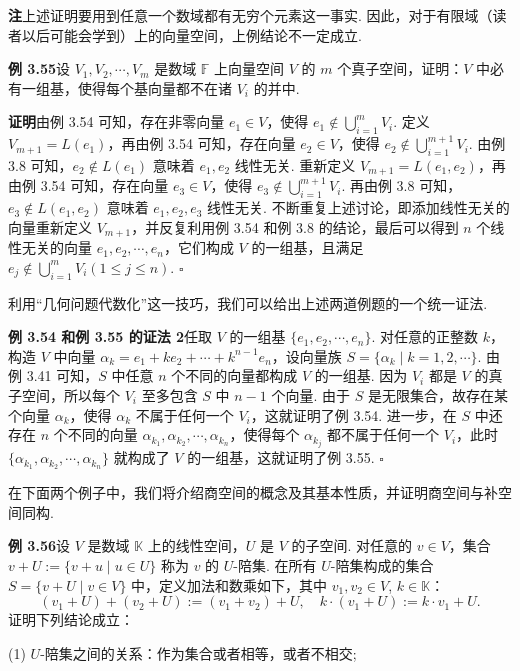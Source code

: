\documentclass[UTF8, 12pt, fontset=fandol, oneside]{ctexart}
\begin{document}
\noindent\textbf{注}\quad 上述证明要用到任意一个数域都有无穷个元素这一事实. 因此，对于有限域（读者以后可能会学到）上的向量空间，上例结论不一定成立.

\noindent\textbf{例 3.55}\quad 设 $V_1,V_2,\cdots,V_m$ 是数域 $\mathbb{F}$ 上向量空间 $V$ 的 $m$ 个真子空间，证明：$V$ 中必有一组基，使得每个基向量都不在诸 $V_i$ 的并中.

\noindent\textbf{证明}\quad 由例 3.54 可知，存在非零向量 $e_1\in V$，使得 $e_1\notin\bigcup_{i=1}^m V_i$. 定义 $V_{m+1}=L(e_1)$，再由例 3.54 可知，存在向量 $e_2\in V$，使得 $e_2\notin\bigcup_{i=1}^{m+1}V_i$. 由例 3.8 可知，$e_2\notin L(e_1)$ 意味着 $e_1,e_2$ 线性无关. 重新定义 $V_{m+1}=L(e_1,e_2)$，再由例 3.54 可知，存在向量 $e_3\in V$，使得 $e_3\notin\bigcup_{i=1}^{m+1}V_i$. 再由例 3.8 可知，$e_3\notin L(e_1,e_2)$ 意味着 $e_1,e_2,e_3$ 线性无关. 不断重复上述讨论，即添加线性无关的向量重新定义 $V_{m+1}$，并反复利用例 3.54 和例 3.8 的结论，最后可以得到 $n$ 个线性无关的向量 $e_1,e_2,\cdots,e_n$，它们构成 $V$ 的一组基，且满足 $e_j\notin\bigcup_{i=1}^m V_i(1\le j\le n)$. $\square$

利用“几何问题代数化”这一技巧，我们可以给出上述两道例题的一个统一证法.

\noindent\textbf{例 3.54 和例 3.55 的证法 2}\quad 任取 $V$ 的一组基 $\{e_1,e_2,\cdots,e_n\}$. 对任意的正整数 $k$，构造 $V$ 中向量 $\alpha_k=e_1+ke_2+\cdots+k^{n-1}e_n$，设向量族 $S=\{\alpha_k\mid k=1,2,\cdots\}$. 由例 3.41 可知，$S$ 中任意 $n$ 个不同的向量都构成 $V$ 的一组基. 因为 $V_i$ 都是 $V$ 的真子空间，所以每个 $V_i$ 至多包含 $S$ 中 $n-1$ 个向量. 由于 $S$ 是无限集合，故存在某个向量 $\alpha_k$，使得 $\alpha_k$ 不属于任何一个 $V_i$，这就证明了例 3.54. 进一步，在 $S$ 中还存在 $n$ 个不同的向量 $\alpha_{k_1},\alpha_{k_2},\cdots,\alpha_{k_n}$，使得每个 $\alpha_{k_j}$ 都不属于任何一个 $V_i$，此时 $\{\alpha_{k_1},\alpha_{k_2},\cdots,\alpha_{k_n}\}$ 就构成了 $V$ 的一组基，这就证明了例 3.55. $\square$

在下面两个例子中，我们将介绍商空间的概念及其基本性质，并证明商空间与补空间同构.

\noindent\textbf{例 3.56}\quad 设 $V$ 是数域 $\mathbb{K}$ 上的线性空间，$U$ 是 $V$ 的子空间. 对任意的 $v\in V$，集合 $v+U:=\{v+u\mid u\in U\}$ 称为 $v$ 的 $U$-陪集. 在所有 $U$-陪集构成的集合 $S=\{v+U\mid v\in V\}$ 中，定义加法和数乘如下，其中 $v_1,v_2\in V$, $k\in\mathbb{K}$：
\[
(v_1+U)+(v_2+U):=(v_1+v_2)+U,\quad k\cdot(v_1+U):=k\cdot v_1+U.
\]
证明下列结论成立：

(1) $U$-陪集之间的关系：作为集合或者相等，或者不相交;
\end{document}
